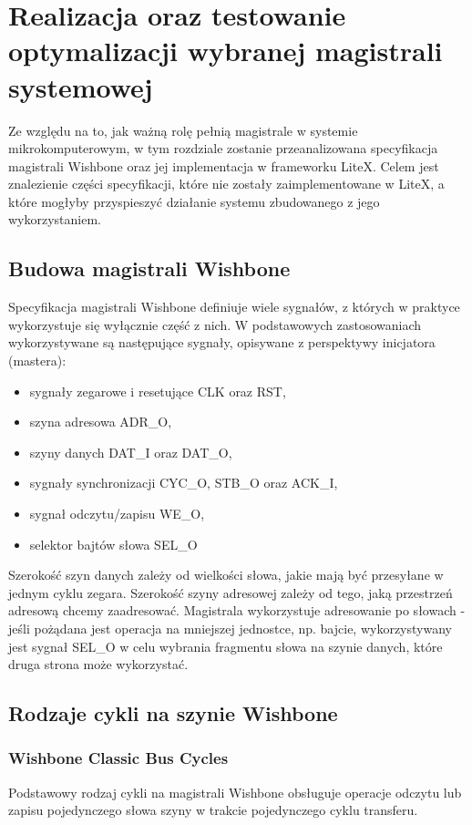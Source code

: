 \section{Realizacja oraz testowanie optymalizacji wybranej magistrali systemowej}
Ze względu na to, jak ważną rolę pełnią magistrale w systemie mikrokomputerowym, w tym rozdziale zostanie przeanalizowana specyfikacja magistrali Wishbone oraz jej implementacja w frameworku LiteX. Celem jest znalezienie części specyfikacji, które nie zostały zaimplementowane w LiteX, a które mogłyby przyspieszyć działanie systemu zbudowanego z jego wykorzystaniem.

\subsection{Budowa magistrali Wishbone}
Specyfikacja magistrali Wishbone definiuje wiele sygnałów, z których w praktyce wykorzystuje się wyłącznie część z nich. W podstawowych zastosowaniach wykorzystywane są następujące sygnały, opisywane z perspektywy inicjatora (mastera):
\begin{itemize}
    \item sygnały zegarowe i resetujące CLK oraz RST,
    \item szyna adresowa ADR_O,
    \item szyny danych DAT_I oraz DAT_O,
    \item sygnały synchronizacji CYC_O, STB_O oraz ACK_I,
    \item sygnał odczytu/zapisu WE_O,
    \item selektor bajtów słowa SEL_O
\end{itemize}

Szerokość szyn danych zależy od wielkości słowa, jakie mają być przesyłane w jednym cyklu zegara. Szerokość szyny adresowej zależy od tego, jaką przestrzeń adresową chcemy zaadresować. Magistrala wykorzystuje adresowanie po słowach - jeśli pożądana jest operacja na mniejszej jednostce, np. bajcie, wykorzystywany jest sygnał SEL_O w celu wybrania fragmentu słowa na szynie danych, które druga strona może wykorzystać.

\subsection{Rodzaje cykli na szynie Wishbone}

\subsubsection{Wishbone Classic Bus Cycles}
Podstawowy rodzaj cykli na magistrali Wishbone obsługuje operacje odczytu lub zapisu pojedynczego słowa szyny w trakcie pojedynczego cyklu transferu.

